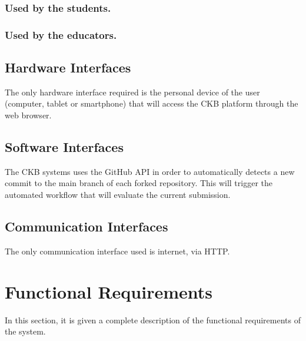 \subsubsection{Used by the students.}
\subsubsection{Used by the educators.}
\subsection{Hardware Interfaces}
The only hardware interface required is the personal device of the user (computer, tablet or smartphone) that will access the CKB platform through the web browser.
\subsection{Software Interfaces}
The CKB systems uses the GitHub API in order to automatically detects a new commit to the main branch of each forked repository. This will trigger the automated workflow that will evaluate the current submission.
\subsection{Communication Interfaces}
The only communication interface used is internet, via HTTP.
\clearpage

\section{Functional Requirements}
In this section, it is given a complete description of the functional requirements of the system.

